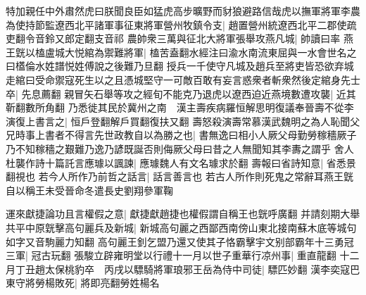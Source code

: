 特加親任中外肅然虎曰朕聞良臣如猛虎高步曠野而豺狼避路信哉虎以撫軍將軍李農為使持節監遼西北平諸軍事征東將軍營州牧鎮令支|{
	趙置營州統遼西北平二郡使疏吏翻令音鈴又郎定翻支音祁}
農帥衆三萬與征北大將軍張舉攻燕凡城|{
	帥讀曰率}
燕王皝以榼盧城大悦綰為禦難將軍|{
	榼苦盍翻水經注曰渝水南流東屈與一水會世名之曰㯼倫水姓譜悦姓傅說之後難乃旦翻}
授兵一千使守凡城及趙兵至將吏皆恐欲弃城走綰曰受命禦寇死生以之且憑城堅守一可敵百敢有妄言惑衆者斬衆然後定綰身先士卒|{
	先息薦翻}
親冒矢石舉等攻之經旬不能克乃退虎以遼西迫近燕境數遭攻襲|{
	近其靳翻數所角翻}
乃悉徙其民於冀州之南　漢主壽疾病羅恒解思明復議奉晉壽不從李演復上書言之|{
	恒戶登翻解戶買翻復扶又翻}
壽怒殺演壽常慕漢武魏明之為人恥聞父兄時事上書者不得言先世政教自以為勝之也|{
	書無逸曰相小人厥父母勤勞稼穡厥子乃不知稼穡之艱難乃逸乃諺既誕否則侮厥父母曰昔之人無聞知其李夀之謂乎}
舍人杜襲作詩十篇託言應璩以諷諫|{
	應璩魏人有文名璩求於翻}
壽報曰省詩知意|{
	省悉景翻視也}
若今人所作乃前哲之話言|{
	話言善言也}
若古人所作則死鬼之常辭耳燕王皝自以稱王未受晉命冬遣長史劉翔參軍鞠

運來獻捷論功且言權假之意|{
	獻捷獻趙捷也權假謂自稱王也皝呼廣翻}
并請刻期大舉共平中原皝擊高句麗兵及新城|{
	新城高句麗之西鄙西南傍山東北接南蘇木底等城句如字又音駒麗力知翻}
高句麗王釗乞盟乃還又使其子恪霸擊宇文别部霸年十三勇冠三軍|{
	冠古玩翻}
張駿立辟雍明堂以行禮十一月以世子重華行凉州事|{
	重直龍翻}
十二月丁丑趙太保桃豹卒　丙戌以驃騎將軍琅邪王岳為侍中司徒|{
	驃匹妙翻}
漢李奕寇巴東守將勞楊敗死|{
	將即亮翻勞姓楊名}


